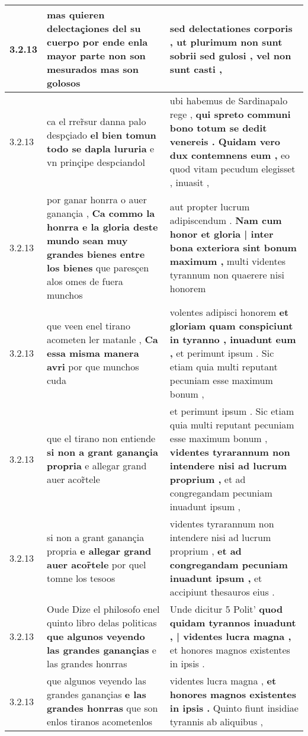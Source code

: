 \begin{tabular}{|p{1cm}|p{6.5cm}|p{6.5cm}|}
3.2.13 & mas quieren delectaçiones del su cuerpo \textbf{ por ende enla mayor parte non son mesurados } mas son golosos & sed delectationes corporis , \textbf{ ut plurimum non sunt sobrii sed gulosi , } vel non sunt casti , \\\hline
3.2.13 & ca el rrer̃sur danna palo despçiado \textbf{ el bien tomun todo se dapla lururia } e vn prinçipe despciandol & ubi habemus de Sardinapalo rege , \textbf{ qui spreto communi bono totum se dedit venereis . Quidam vero dux contemnens eum , } eo quod vitam pecudum elegisset , inuasit , \\\hline
3.2.13 & por ganar honrra o auer ganançia , \textbf{ Ca commo la honrra e la gloria deste mundo sean muy grandes bienes entre los bienes } que paresçen alos omes de fuera munchos & aut propter lucrum adipiscendum . \textbf{ Nam cum honor et gloria | inter bona exteriora sint bonum maximum , } multi videntes tyrannum non quaerere nisi honorem \\\hline
3.2.13 & que veen enel tirano acometen ler matanle , \textbf{ Ca essa misma manera avri } por que munchos cuda & volentes adipisci honorem \textbf{ et gloriam quam conspiciunt in tyranno , inuadunt eum , } et perimunt ipsum . Sic etiam quia multi reputant pecuniam esse maximum bonum , \\\hline
3.2.13 & que el tirano non entiende \textbf{ si non a grant ganançia propria } e allegar grand auer acor̃tele & et perimunt ipsum . Sic etiam quia multi reputant pecuniam esse maximum bonum , \textbf{ videntes tyrarannum non intendere nisi ad lucrum proprium , } et ad congregandam pecuniam inuadunt ipsum , \\\hline
3.2.13 & si non a grant ganançia propria \textbf{ e allegar grand auer acor̃tele } por quel tomne los tesoos & videntes tyrarannum non intendere nisi ad lucrum proprium , \textbf{ et ad congregandam pecuniam inuadunt ipsum , } et accipiunt thesauros eius . \\\hline
3.2.13 & Oude Dize el philosofo enel quinto libro delas politicas \textbf{ que algunos veyendo las grandes ganançias } e las grandes honrras & Unde dicitur 5 Polit’ \textbf{ quod quidam tyrannos inuadunt , | videntes lucra magna , } et honores magnos existentes in ipsis . \\\hline
3.2.13 & que algunos veyendo las grandes ganançias \textbf{ e las grandes honrras } que son enlos tiranos acometenlos & videntes lucra magna , \textbf{ et honores magnos existentes in ipsis . } Quinto fiunt insidiae tyrannis ab aliquibus , \\\hline

\end{tabular}
